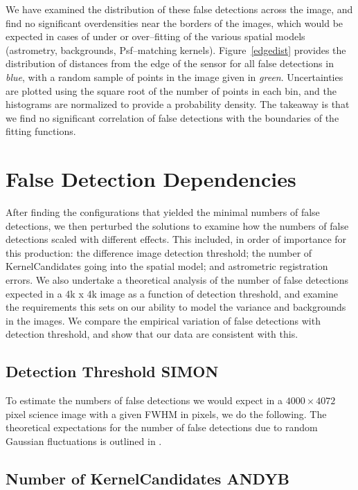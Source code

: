 \documentclass[prd, nofootinbib, floatfix, 11pt,tightenlines,times]{article}
\begin{document}
We have examined the distribution of these false detections across the
image, and find no significant overdensities near the borders of the
images, which would be expected in cases of under or over--fitting of
the various spatial models (astrometry, backgrounds, Psf--matching
kernels).  Figure~\ref{edgedist} provides the distribution of
distances from the edge of the sensor for all false detections in {\it
  blue}, with a random sample of points in the image given in {\it
  green}.  Uncertainties are plotted using the square root of the
number of points in each bin, and the histograms are normalized to
provide a probability density.  The takeaway is that we find no
significant correlation of false detections with the boundaries of the
fitting functions.

\section{False Detection Dependencies}

After finding the configurations that yielded the minimal numbers of
false detections, we then perturbed the solutions to examine how the
numbers of false detections scaled with different effects.  This
included, in order of importance for this production: the difference
image detection threshold; the number of KernelCandidates going into
the spatial model; and astrometric registration errors.  We also
undertake a theoretical analysis of the number of false detections
expected in a 4k x 4k image as a function of detection threshold, and
examine the requirements this sets on our ability to model the
variance and backgrounds in the images.  We compare the empirical
variation of false detections with detection threshold, and show that
our data are consistent with this.

\subsection{Detection Threshold {\bf SIMON}}

To estimate the numbers of false detections we would expect in a
$4000\times4072$ pixel science image with a given FWHM in pixels, we
do the following.  The theoretical expectations for the number of
false detections due to random Gaussian fluctuations is outlined in
\cite{Kaiser-PointSources}.

\subsection{Number of KernelCandidates {\bf ANDYB}}
\end{document}
